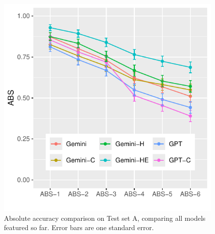 \documentclass[fleqn,moreauthors,10pt]{ds_report}
\begin{document}
\begin{table}[tbp]
\centering
{}
\caption{Model comparison on Test set A. The average number of codes per company is included. Note that all the differences between the best performing model (in bold) and the second best are more than 2 standard errors. While the test set is relatively small, the accuracies close to 100\% have small variance.}
\label{tab:results1}
\end{table}

\begin{figure}[tbp]\centering
	\includegraphics[width=0.7\linewidth]{abs.pdf}
	\caption{Absolute accuracy comparison on Test set A, comparing all models featured so far. Error bars are one standard error.}
	\label{fig:absolute}
\end{figure}
\end{document}
